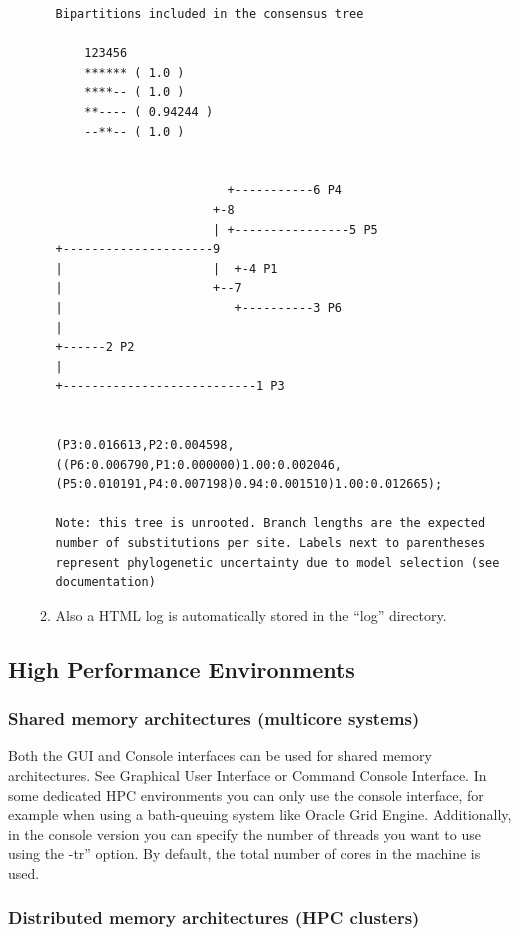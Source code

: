 \begin{enumerate}
\begin{enumerate}
\begin{lstlisting}
Bipartitions included in the consensus tree
 
    123456
    ****** ( 1.0 )
    ****-- ( 1.0 )
    **---- ( 0.94244 )
    --**-- ( 1.0 )

 
                        +-----------6 P4
                      +-8
                      | +----------------5 P5
+---------------------9
|                     |  +-4 P1
|                     +--7
|                        +----------3 P6
|
+------2 P2
|
+---------------------------1 P3

 
(P3:0.016613,P2:0.004598,((P6:0.006790,P1:0.000000)1.00:0.002046,(P5:0.010191,P4:0.007198)0.94:0.001510)1.00:0.012665);
 
Note: this tree is unrooted. Branch lengths are the expected number of substitutions per site. Labels next to parentheses represent phylogenetic uncertainty due to model selection (see documentation)
\end{lstlisting}

\item Also a HTML log is automatically stored in the ``log'' directory.

\end{enumerate}
\end{enumerate}

\subsection{High Performance Environments}

\subsubsection{Shared memory architectures (multicore systems)}

Both the GUI and Console interfaces can be used for shared memory architectures. See Graphical User Interface or Command Console Interface. In some dedicated HPC environments you can only use the console interface, for example when using a bath-queuing system like Oracle Grid Engine. Additionally, in the console version you can specify the number of threads you want to use using the -tr'' option. By default, the total number of cores in the machine is used.

\subsubsection{Distributed memory architectures (HPC clusters)}


